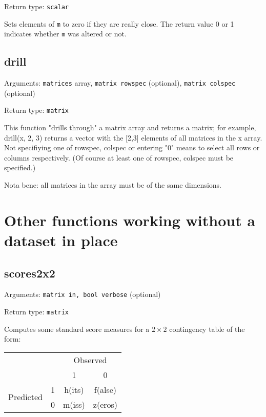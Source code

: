 \documentclass[11pt,english]{article}
\providecommand{\tabularnewline}{\\}
\begin{document}
\noindent Return type: \texttt{scalar}

Sets elements of \texttt{m} to zero if they are really close. The
return value 0 or 1 indicates whether \texttt{m} was altered or not.

\subsection{drill}

Arguments: \texttt{matrices} array, \texttt{matrix rowspec} (optional), 
  \texttt{matrix colspec} (optional)
  
\noindent Return type: \texttt{matrix}

This function "drills through" a matrix array and returns a matrix;
for example, drill(x, 2, 3) returns a vector with the [2,3] elements
of all matrices in the x array. Not specifiying one of rowspec, colspec
or entering "0" means to select all rows or columns respectively. 
(Of course at least one of rowspec, colspec must be specified.)

Nota bene: all matrices in the array must be of the same dimensions.


\section{Other functions working without a dataset in place}

\subsection{scores2x2}

Arguments: \texttt{matrix in, bool verbose} (optional)

\noindent Return type: \texttt{matrix}

Computes some standard score measures for a $2\times 2$ contingency
table of the form:

\begin{tabular}{cccc}
\toprule 
 &  & \multicolumn{2}{c}{Observed}\tabularnewline
 &  & 1 & 0\tabularnewline
\midrule
\multirow{2}{*}{Predicted} & 1 & h(its) & f(alse)\tabularnewline
 & 0 & m(iss) & z(eros)\tabularnewline
\bottomrule
\end{tabular}
\end{document}
